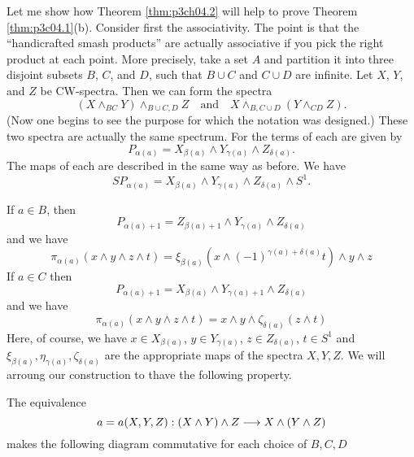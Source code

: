 \documentclass[../main]{subfiles}
\begin{document}
Let me show how Theorem \ref{thm:p3ch04.2} will help to prove Theorem \ref{thm:p3c04.1}(b).
Consider first the associativity.
The point is that the ``handicrafted smash products'' are actually associative if you pick the right product at each point.
More precisely, take a set $A$ and partition it into three disjoint subsets $B$, $C$, and $D$, such that $B \cup C$ and $C \cup D$ are infinite.
Let $X$, $Y$, and $Z$ be CW-spectra.
Then we can form the spectra
\[
    (X \wedge_{BC} Y) \wedge_{B \cup C, D} Z \quad \text{and} \quad X \wedge_{B, C \cup D} (Y \wedge_{CD} Z).
\]
(Now one begins to see the purpose for which the notation was designed.)
These two spectra are actually the same spectrum.
For the terms of each are given by
\[
    P_{\alpha(a)} = X_{\beta(a)} \wedge Y_{\gamma(a)} \wedge Z_{\delta(a)}.
\]
The maps of each are described in the same way as before.
We have
\[
    SP_{\alpha(a)} = X_{\beta(a)} \wedge Y_{\gamma(a)} \wedge Z_{\delta(a)} \wedge S^{1}.
\]

If $a\in B$, then 
$$ P_{\alpha(a)+1} = Z_{\beta(a)+1} \wedge Y_{\gamma(a)} \wedge Z_{\delta(a)}$$
and we have 
$$ \pi_{\alpha(a)}(x \wedge y \wedge z\wedge t) = \xi_{\beta(a)} (x \wedge (-1)^{\gamma(a)+\delta(a)}t )\wedge y\wedge z$$
If $a\in C$ then 
$$P_{\alpha(a)+1} = X_{\beta(a)} \wedge Y_{\gamma(a)+1} \wedge Z_{\delta(a)}$$
and we have 
$$\pi_{\alpha(a)}(x \wedge y\wedge z \wedge t) = x \wedge y\wedge  \zeta_{\delta(a)} (z \wedge t)$$
Here, of course, we have $x\in X_{\beta(a)}$, $y\in Y_{\gamma(a)}$, $z\in Z_{\delta(a)}$, $t\in S^1$ and $\xi_{\beta(a)},\eta_{\gamma(a)}, \zeta_{\delta(a)}$ are the appropriate maps of the spectra $X,Y,Z$.
We will arroung our construction to thave the following property.
\begin{theorem}\label{thm:p3c04.3}
    The equivalence
    $$a=a(X,Y,Z):(X\wedge Y)\wedge Z\overset{}{\longrightarrow} X\wedge(Y\wedge Z)$$
    makes the following diagram commutative for each choice of $B,C,D$
    
     {
    }
\end{theorem}
\end{document}
